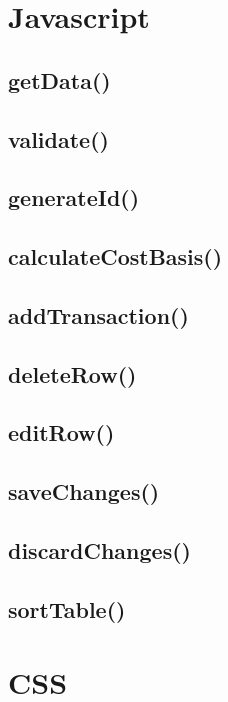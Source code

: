 \documentclass[letterpaper]{article}
\begin{document}
\newpage

\section{Javascript}

\subsection{getData()}

\subsection{validate()}

\subsection{generateId()}

\subsection{calculateCostBasis()}

\subsection{addTransaction()}

\subsection{deleteRow()}

\subsection{editRow()}

\subsection{saveChanges()}

\subsection{discardChanges()}

\subsection{sortTable()}

\newpage

\section{CSS}
\end{document}
